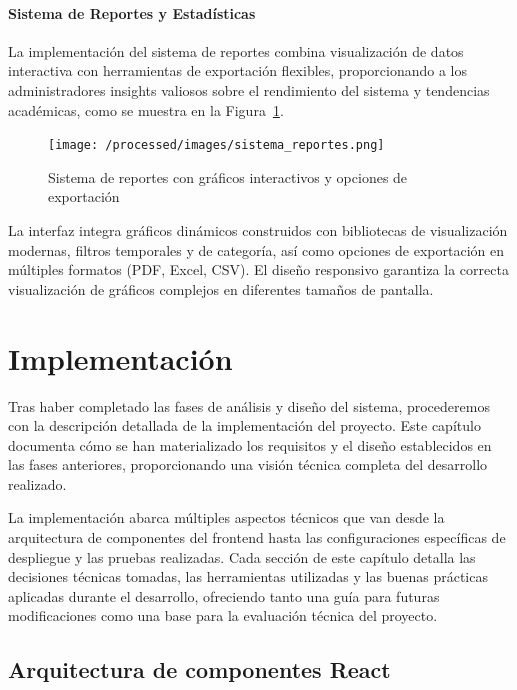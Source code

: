 \documentclass[12pt,a4paper,oneside]{report}
\begin{document}
\subsubsection{Sistema de Reportes y Estadísticas}\label{sistema-de-reportes-y-estadisticas}

La implementación del sistema de reportes combina visualización de datos interactiva con herramientas de exportación flexibles, proporcionando a los administradores insights valiosos sobre el rendimiento del sistema y tendencias académicas, como se muestra en la Figura~\ref{fig:sistema-reportes}.

\begin{figure}[H]
\centering
\texttt{[image: /processed/images/sistema\_reportes.png]}
\caption{Sistema de reportes con gráficos interactivos y opciones de exportación}
\label{fig:sistema-reportes}
\end{figure}

La interfaz integra gráficos dinámicos construidos con bibliotecas de visualización modernas, filtros temporales y de categoría, así como opciones de exportación en múltiples formatos (PDF, Excel, CSV). El diseño responsivo garantiza la correcta visualización de gráficos complejos en diferentes tamaños de pantalla.

\chapter{Implementación}\label{implementaciuxf3n}
Tras haber completado las fases de análisis y diseño del sistema,
procederemos con la descripción detallada de la implementación del
proyecto. Este capítulo documenta cómo se han materializado los
requisitos y el diseño establecidos en las fases anteriores,
proporcionando una visión técnica completa del desarrollo realizado.

La implementación abarca múltiples aspectos técnicos que van desde la
arquitectura de componentes del frontend hasta las configuraciones
específicas de despliegue y las pruebas realizadas. Cada sección de este
capítulo detalla las decisiones técnicas tomadas, las herramientas
utilizadas y las buenas prácticas aplicadas durante el desarrollo,
ofreciendo tanto una guía para futuras modificaciones como una base para
la evaluación técnica del proyecto.

\section{Arquitectura de componentes
React}\label{arquitectura-de-componentes-react-1}
\end{document}

